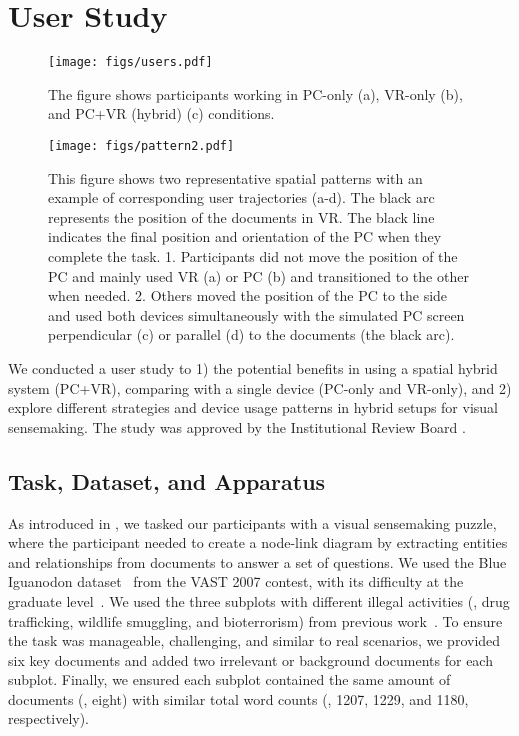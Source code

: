 \section{User Study}
\label{sec:study}

\begin{figure}
\centering
\texttt{[image: figs/users.pdf]}
\caption{The figure shows participants working in PC-only (a), VR-only (b), and PC+VR (hybrid) (c) conditions.}
\label{fig:setup}
\end{figure}

\begin{figure*}
\centering
\texttt{[image: figs/pattern2.pdf]}
\caption{This figure shows two representative spatial patterns with an example of corresponding user trajectories (a-d). The black arc represents the position of the documents in VR. The black line indicates the final position and orientation of the PC when they complete the task. 1. Participants did not move the position of the PC and mainly used VR (a) or PC (b) and transitioned to the other when needed. 2. Others moved the position of the PC to the side and used both devices simultaneously with the simulated PC screen perpendicular (c) or parallel (d) to the documents (the black arc).}
\label{fig:patterns_prelimiary}
\end{figure*}

We conducted a user study to 1)  the potential benefits in using a spatial hybrid system (PC+VR), comparing with a single device (PC-only and VR-only), and 2) explore different strategies and device usage patterns in hybrid setups for visual sensemaking. 
The study was approved by the Institutional Review Board .

\subsection{Task, Dataset, and Apparatus}
As introduced in , we tasked our participants with a visual sensemaking puzzle, where the participant needed to create a node-link diagram by extracting entities and relationships from documents to answer a set of questions.  
We used the Blue Iguanodon dataset~\cite{grinstein2007vast} from the VAST 2007 contest, with its difficulty at the graduate level~\cite{whiting2009vast}. 
We used the three subplots with different illegal activities (\ie{}, drug trafficking, wildlife smuggling, and bioterrorism) from previous work~\cite{tong2023towards}. 
To ensure the task was manageable, challenging, and similar to real scenarios, we provided six key documents and added two irrelevant or background documents for each subplot. Finally, we ensured each subplot contained the same amount of documents (\ie{}, eight) with similar total word counts (\ie{}, 1207, 1229, and 1180, respectively).

